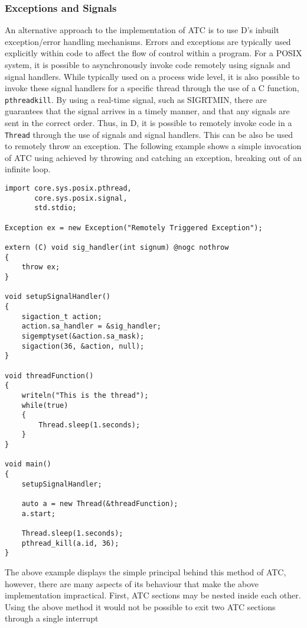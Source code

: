 \subsubsection*{Exceptions and Signals}
An alternative approach to the implementation of ATC is to use D's inbuilt exception/error 
handling mechanisms. Errors and exceptions are typically used explicitly within code 
to affect the flow of control within a program.
For a POSIX system, it is possible to asynchronously invoke code remotely using 
signals and signal handlers. While typically used on a process wide level, it
is also possible to invoke these signal handlers for a specific thread through
the use of a C function, \texttt{pthread\textunderscore{}kill}. By using a
real-time signal, such as SIGRTMIN, there are guarantees that the signal
arrives in a timely manner, and that any signals are sent in the correct order. 
Thus, in D, it is possible to remotely invoke code in a \texttt{Thread} through 
the use of signals and signal handlers. This can be also be used to remotely
throw an exception. The following example shows a simple invocation of ATC
using achieved by throwing and catching an exception, breaking out of an
infinite loop. 
\begin{lstlisting}
import core.sys.posix.pthread, 
       core.sys.posix.signal, 
       std.stdio;

Exception ex = new Exception("Remotely Triggered Exception"); 

extern (C) void sig_handler(int signum) @nogc nothrow
{
    throw ex;
}

void setupSignalHandler()
{
    sigaction_t action; 
    action.sa_handler = &sig_handler; 
    sigemptyset(&action.sa_mask);
    sigaction(36, &action, null); 
}

void threadFunction()
{
    writeln("This is the thread"); 
    while(true)
    {
        Thread.sleep(1.seconds);
    }
}

void main()
{
    setupSignalHandler; 

    auto a = new Thread(&threadFunction); 
    a.start; 

    Thread.sleep(1.seconds); 
    pthread_kill(a.id, 36); 
}
\end{lstlisting}
The above example displays the simple principal behind this method of ATC, 
however, there are many aspects of its behaviour that make the above
implementation impractical. 
First, ATC sections may be nested inside each other. Using the above 
method it would not be possible to exit two ATC sections through a single interrupt
